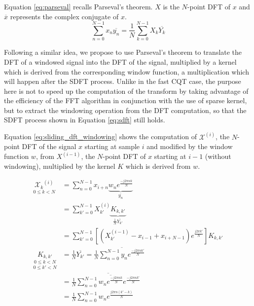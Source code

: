 \documentclass[journal]{IEEEtran}
\begin{document}
Equation \ref{eq:parseval} recalls Parseval's theorem. $X$ is the $N$-point DFT of $x$ and $\overline{x}$ represents the complex conjugate of $x$.
\begin{equation}
\label{eq:parseval}
\sum_{n=0}^{N-1} x_n \overline{y_n} = \frac{1}{N} \sum_{k=0}^{N-1} X_k \overline{Y_k}
\end{equation}

Following a similar idea, we propose to use Parseval's theorem to translate the DFT of a windowed signal into the DFT of the signal, multiplied by a kernel which is derived from the corresponding window function, a multiplication which will happen after the SDFT process. Unlike in the fast CQT case, the purpose here is not to speed up the computation of the transform by taking advantage of the efficiency of the FFT algorithm in conjunction with the use of sparse kernel, but to extract the windowing operation from the DFT computation, so that the SDFT process shown in Equation \ref{eq:sdft} still holds.

Equation \ref{eq:sliding_dft_windowing} shows the computation of $\mathcal{X}^{(i)}$, the $N$-point DFT of the signal $x$ starting at sample $i$ and modified by the window function $w$, from $X^{(i-1)}$, the $N$-point DFT of $x$ starting at $i-1$ (without windowing), multiplied by the kernel $K$ which is derived from $w$.

\begin{equation}
\label{eq:sliding_dft_windowing}
\begin{split}
\underset{0 \leq k < N}{{\mathcal{X}_k}^{(i)}}
& = \sum_{n=0}^{N-1} x_{i+n} \underbrace{w_n e^{\frac{-j 2\pi n k}{N}}}_{\overline{y_n}} \\
& = \sum_{k'=0}^{N-1} X_{k'}^{(i)} \underbrace{K_{k,k'}}_{\frac{1}{N} \overline{Y_{k'}}} \\
& = \sum_{k'=0}^{N-1} \left[\left(X_{k'}^{(i-1)} - x_{i-1} + x_{i+N-1} \right) e^{\frac{j 2\pi k'}{N}}\right] K_{k,k'} \\
\underset{0 \leq k' < N}{\underset{0 \leq k < N}{K_{k,k'}}} 
& = \frac{1}{N} \overline{Y_{k'}} = \frac{1}{N} \overline{\sum_{n=0}^{N-1} y_n  e^{\frac{-j 2\pi n k'}{N}}} \\
& = \frac{1}{N} \overline{\sum_{n=0}^{N-1} \overline{w_n e^{\frac{-j 2\pi n k}{N}}}  e^{\frac{-j 2\pi n k'}{N}}} \\
& = \frac{1}{N} \sum_{n=0}^{N-1} w_n e^{\frac{j 2\pi n (k'-k)}{N}}
\end{split}
\end{equation}
\end{document}

